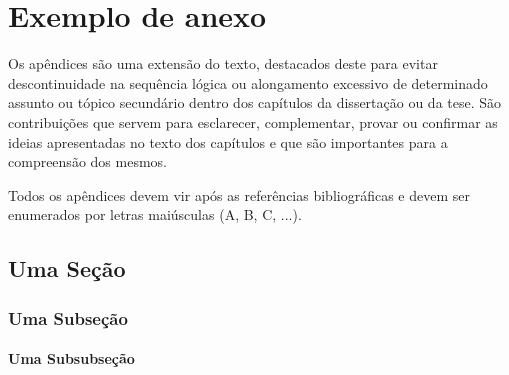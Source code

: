 \chapter{Exemplo de anexo}


Os apêndices são uma extensão do texto, destacados deste para evitar descontinuidade na sequência lógica ou alongamento excessivo de determinado assunto ou tópico secundário dentro dos capítulos da dissertação ou da tese. São contribuições que servem para esclarecer, complementar, provar ou confirmar as ideias apresentadas no texto dos capítulos e que são importantes para a compreensão dos mesmos.

Todos os apêndices devem vir após as referências bibliográficas e devem ser enumerados por letras maiúsculas (A, B, C, ...).


\section{Uma Seção}

\lipsum[20-23]


\subsection{Uma Subseção}

\lipsum[30-33]


\subsubsection{Uma Subsubseção}

\lipsum[30-33]

